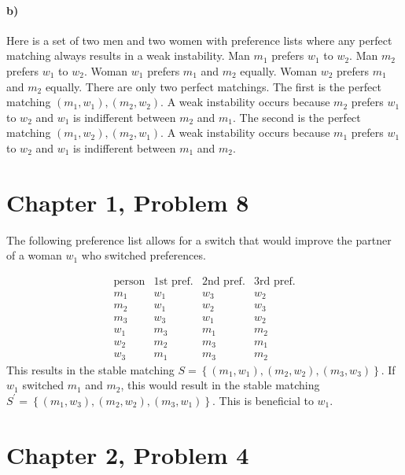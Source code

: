 \documentclass[12pt]{article}
\begin{document}
\paragraph{b)}

Here is a set of two men and two women with preference lists where any perfect matching always results in a
weak instability. Man \(m_1\) prefers \(w_1\) to \(w_2\). Man \(m_2\) prefers \(w_1\) to \(w_2\). Woman
\(w_1\) prefers \(m_1\) and \(m_2\) equally. Woman \(w_2\) prefers \(m_1\) and \(m_2\) equally. There are only
two perfect matchings. The first is the perfect matching \((m_1,w_1), (m_2,w_2)\). A weak instability occurs because \(m_2\)
prefers \(w_1\) to \(w_2\) and \(w_1\) is indifferent between \(m_2\) and \(m_1\). The second is the perfect matching
\((m_1,w_2), (m_2,w_1)\). A weak instability occurs because \(m_1\) prefers \(w_1\) to \(w_2\) and \(w_1\) is
indifferent between \(m_1\) and \(m_2\).

\pagebreak

\section*{Chapter 1, Problem 8}

The following preference list allows for a switch that would improve the partner of a woman \(w_1\) who switched preferences.

\[
        \begin{array}{cccc}
                \text{person} & 1\text{st pref.} & 2\text{nd pref.} & 3\text{rd pref.} \\
                m_1 & w_1 & w_3 & w_2\\
                m_2 & w_1 & w_2 & w_3\\
                m_3 & w_3 & w_1 & w_2\\
                w_1 & m_3 & m_1 & m_2\\
                w_2 & m_2 & m_3 & m_1\\
                w_3 & m_1 & m_3 & m_2
        \end{array}
\]
This results in the stable matching \(S=\left\{(m_1,w_1),(m_2,w_2),(m_3,w_3)\right\}\). If \(w_1\) switched \(m_1\) and \(m_2\), this
would result in the stable matching \(S^\prime=\left\{(m_1,w_3),(m_2,w_2),(m_3,w_1)\right\}\). This is beneficial to \(w_1\).

\pagebreak

\section*{Chapter 2, Problem 4}
\end{document}
